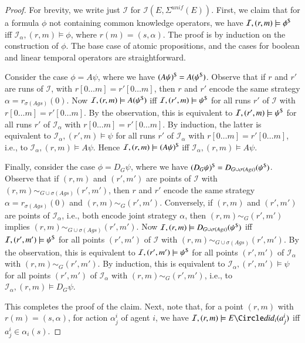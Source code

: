 \documentclass[a4wide]{article}
\theoremstyle{examplesty}
\newcommand{\strat}{\sigma}
\newcommand{\Ags}{\mathit{Ags}}
\newcommand{\I}{\mathcal{I}}
\newcommand{\nxt}{\Circle}
\newcommand{\unif}{\mathit{unif}}
\newcommand{\Strat}{\Sigma}
\begin{document}
\begin{proof} 
For brevity, we write just $\I$ for $\I(E,\Strat^\unif(E))$. 
First, we claim that for a formula $\phi$ not containing common knowledge operators, 
we have  $\I,(r,m) \models \trlk{\phi}$ iff $\I_\alpha, (r,m) \models \phi$, where $r(m) = (s,\alpha)$. 
The proof is by induction on the construction of $\phi$. The base case of atomic propositions, and the cases
for boolean and linear temporal operators are straightforward. 

Consider the case  $\phi = A\psi$, where we have  $(A\psi)^\$ = A(\psi^\$)$. 
Observe that if $r$ and $r'$ are runs of $\I$, with $r[0\ldots m] = r'[0\ldots m]$, then 
$r$ and $r'$ encode the same strategy $\alpha = r_{\strat(\Ags)}(0)$. 
Now $\I,(r,m) \models A(\trlk{\psi})$ iff $\I,(r',m)\models \trlk{\psi}$ for all runs $r'$ of $\I$ with 
 $r[0\ldots m] = r'[0\ldots m]$. By the observation, this is 
 equivalent to 
$\I,(r',m)\models \trlk{\psi}$ for all runs $r'$ of $\I_\alpha$ with 
 $r[0\ldots m] = r'[0\ldots m]$.
 By induction, the latter is equivalent to 
 $\I_\alpha,(r',m)\models \psi$ for all runs $r'$ of $\I_\alpha$ with 
 $r[0\ldots m] = r'[0\ldots m]$, i.e., to $\I_\alpha,(r,m) \models A\psi$.  
 Hence $\I,(r,m) \models \trlk{(A\psi)}$ iff $\I_\alpha,(r,m) \models A\psi$. 


Finally, consider the case  $\phi = D_G\psi$, where we have  $\trlk{(D_G\psi)} = D_{G\cup \strat(\Ags)} (\trlk{\psi})$. 
Observe that if $(r,m)$ and $(r',m')$ are points of $\I$ with $(r,m) \sim_{G\cup\strat(\Ags)}  (r',m')$, then 
$r$ and $r'$ encode the same strategy $\alpha = r_{\strat(\Ags)}(0)$ and $(r,m) \sim_{G}  (r',m')$. 
Conversely, if $(r,m)$ and $(r',m')$ are points of $\I_\alpha$, i.e., both encode joint strategy $\alpha$, 
then  $(r,m) \sim_{G}  (r',m')$ implies $(r,m) \sim_{G\cup\strat(\Ags)}  (r',m')$. 
Now $\I,(r,m) \models D_{G\cup \strat(\Ags)} (\trlk{\psi})$ iff $\I,(r',m')\models \trlk{\psi}$ for all points $(r',m')$ of $\I$ with 
 $(r,m) \sim_{G\cup\strat(\Ags)}  (r',m')$. By the observation, this is 
 equivalent to 
$\I,(r',m')\models \trlk{\psi}$ for all points $(r',m')$ of $\I_\alpha$ with 
 $(r,m) \sim_{G}  (r',m')$.
 By induction, this is equivalent to 
 $\I_\alpha,(r',m')\models \psi$ for all points $(r',m')$ of $\I_\alpha$ with 
 $(r,m) \sim_{G}  (r',m')$, i.e., to $\I_\alpha,(r,m) \models D_G\psi$.  
 
This completes the proof of the claim.  Next, note that, for a point $(r,m)$ with $r(m) = (s,\alpha)$, 
for action $\alpha^i_j$ of agent $i$, we have $\I,(r,m) \models E\nxt \did_i(a^i_j)$ iff $a^i_j \in \alpha_i(s)$. 


\end{proof}
\end{document}
